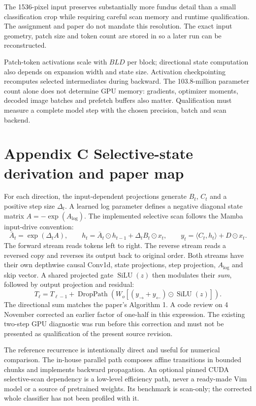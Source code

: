 The 1536-pixel input preserves substantially more fundus detail than a
small classification crop while requiring careful scan memory and runtime
qualification. The assignment and paper do not mandate this resolution.
The exact input geometry, patch size and token count are stored in
 so a later run can be reconstructed.

Patch-token activations scale with $BLD$ per block; directional state
computation also depends on expansion width and state size. Activation
checkpointing recomputes selected intermediates during backward. The
103.8-million parameter count alone does not determine GPU memory:
gradients, optimizer moments, decoded image batches and prefetch buffers
also matter. Qualification must measure a complete model step with the
chosen precision, batch and scan backend.

\newpage
\section*{\color{ink}Appendix C \quad Selective-state derivation and paper map}
For each direction, the input-dependent projections generate $B_t$, $C_t$
and a positive step size $\Delta_t$. A learned log parameter defines a
negative diagonal state matrix $A=-\exp(A_{\log})$. The implemented
selective scan follows the Mamba input-drive convention:
\[
 \bar A_t=\exp(\Delta_t A),\qquad
 h_t=\bar A_t\odot h_{t-1}+\Delta_t B_t\odot x_t,
 \qquad y_t=\langle C_t,h_t\rangle+D\odot x_t.
\]
The forward stream reads tokens left to right. The reverse stream reads a
reversed copy and reverses its output back to original order. Both streams
have their own depthwise causal Conv1d, state projections, step projection,
$A_{\log}$ and skip vector. A shared projected gate $\operatorname{SiLU}(z)$
then modulates their \emph{sum}, followed by output projection and residual:
\[
 T_{\ell}=T_{\ell-1}
 +\operatorname{DropPath}\!\left(W_o[(y_{\rightarrow}+y_{\leftarrow})
 \odot\operatorname{SiLU}(z)]\right).
\]
The directional sum matches the paper's Algorithm 1. A code review on
4 November corrected an earlier factor of one-half in this expression.
The existing two-step GPU diagnostic was run before this correction and
must not be presented as qualification of the present source revision.

The reference recurrence is intentionally direct and useful for numerical
comparison. The in-house parallel path composes affine transitions in
bounded chunks and implements backward propagation. An optional pinned
CUDA selective-scan dependency is a low-level efficiency path, never a
ready-made Vim model or a source of pretrained weights. Its benchmark is
scan-only; the corrected whole classifier has not been profiled with it.


